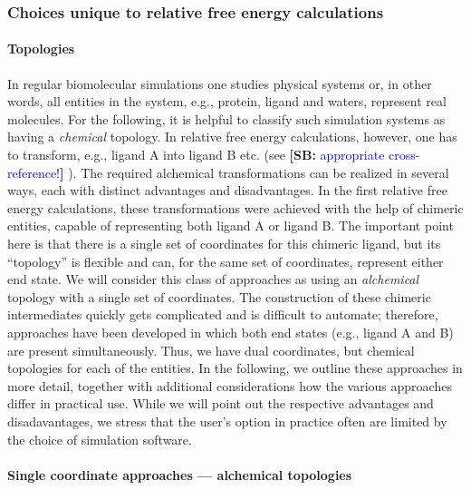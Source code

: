 \documentclass[9pt,bestpractices]{livecoms}
\newcommand{\sbnote}[1]{%
  {\bfseries{}[SB: }%
  {\textcolor{blue}{#1}}{\bfseries{}]}
}
\begin{document}
\subsubsection{Choices unique to relative free energy calculations}
\label{sec:relative-fe-protocol}

\paragraph{Topologies} In regular biomolecular simulations one studies physical systems or, in other words, all entities in the system, e.g., protein, ligand and waters, represent real molecules. For the following, it is helpful to classify such simulation systems as having a {\em chemical} topology. In relative free energy calculations, however, one has to transform, e.g., ligand A into ligand B etc. (see \sbnote{appropriate cross-reference!}). The required alchemical transformations can be realized in several ways, each with distinct advantages and disadvantages. In the first relative free energy calculations, these transformations were achieved with the help of chimeric entities, capable of representing both ligand A or ligand B. The important point here is that there is a single set of coordinates for this chimeric ligand, but its ``topology'' is flexible and can, for the same set of coordinates, represent either end state. We will consider this class of approaches as using an {\em alchemical} topology with a single set of coordinates. The construction of these chimeric intermediates quickly gets complicated and is difficult to automate; therefore, approaches have been developed in which both end states (e.g., ligand A and B) are present simultaneously. Thus, we have dual coordinates, but chemical topologies for each of the entities. In the following, we outline these approaches in more detail, together with additional considerations how the various approaches differ in practical use. While we will point out the respective advantages and disadavantages, we stress that the user's option in practice often are limited by the choice of simulation software.

\paragraph{Single coordinate approaches --- alchemical topologies}
\end{document}

